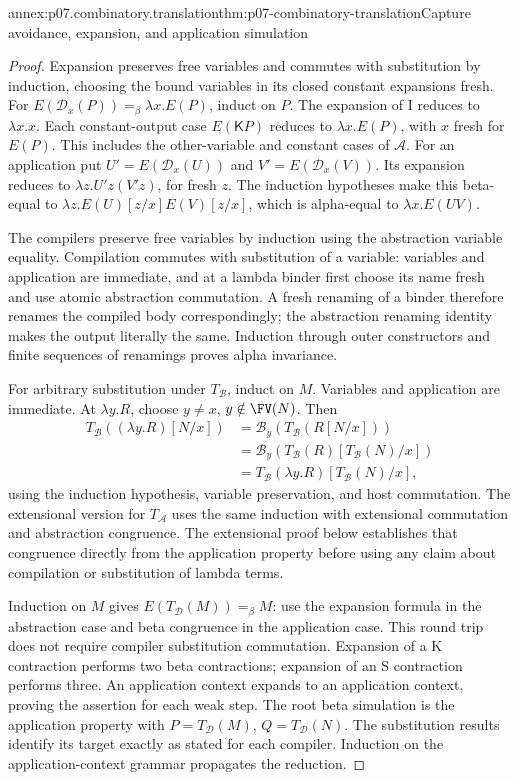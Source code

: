 \begin{annexitem}{annex:p07.combinatory.translation}{thm:p07-combinatory-translation}{Capture avoidance, expansion, and application simulation}
\begin{proof}
Expansion preserves free variables and commutes with substitution by induction,
choosing the bound variables in its closed constant expansions fresh.
For \(E(\mathcal D_x(P))=_\beta\lambda x.E(P)\), induct on \(P\).
The expansion of I reduces to \(\lambda x.x\).  Each constant-output case
\(E(\mathsf KP)\) reduces to \(\lambda x.E(P)\), with \(x\) fresh for
\(E(P)\).  This includes the other-variable and constant cases of \(\mathcal A\).
For an application put \(U'=E(\mathcal D_x(U))\) and
\(V'=E(\mathcal D_x(V))\).  Its expansion reduces to
\(\lambda z.U'z(V'z)\), for fresh \(z\).  The induction hypotheses make this
beta-equal to \(\lambda z.E(U)[z/x]E(V)[z/x]\), which is alpha-equal to
\(\lambda x.E(UV)\).

The compilers preserve free variables by induction using the abstraction
variable equality.  Compilation commutes with substitution of a variable:
variables and application are immediate, and at a lambda binder first choose
its name fresh and use atomic abstraction commutation.  A fresh renaming of a
binder therefore renames the compiled body correspondingly; the abstraction
renaming identity makes the output literally the same.  Induction through
outer constructors and finite sequences of renamings proves alpha invariance.

For arbitrary substitution under \(T_{\mathcal B}\), induct on \(M\).
Variables and application are immediate.  At \(\lambda y.R\), choose
\(y\ne x\), \(y\notin\FV(N)\).  Then
\[
\begin{aligned}
 T_{\mathcal B}((\lambda y.R)[N/x])
 &=\mathcal B_y(T_{\mathcal B}(R[N/x]))\\
 &=\mathcal B_y(T_{\mathcal B}(R)[T_{\mathcal B}(N)/x])\\
 &=T_{\mathcal B}(\lambda y.R)[T_{\mathcal B}(N)/x],
\end{aligned}
\]
using the induction hypothesis, variable preservation, and host commutation.
The extensional version for \(T_{\mathcal A}\) uses the same induction with
extensional commutation and abstraction congruence.  The extensional proof
below establishes that congruence directly from the application property before
using any claim about compilation or substitution of lambda terms.

Induction on \(M\) gives \(E(T_{\mathcal D}(M))=_\beta M\): use the expansion
formula in the abstraction case and beta congruence in the application case.
This round trip does not require compiler substitution commutation.
Expansion of a K contraction performs two beta contractions; expansion of an
S contraction performs three.  An application context expands to an application
context, proving the assertion for each weak step.
The root beta simulation is the application property with
\(P=T_{\mathcal D}(M)\), \(Q=T_{\mathcal D}(N)\).  The substitution results
identify its target exactly as stated for each compiler.  Induction on the
application-context grammar propagates the reduction.
\end{proof}
\end{annexitem}


